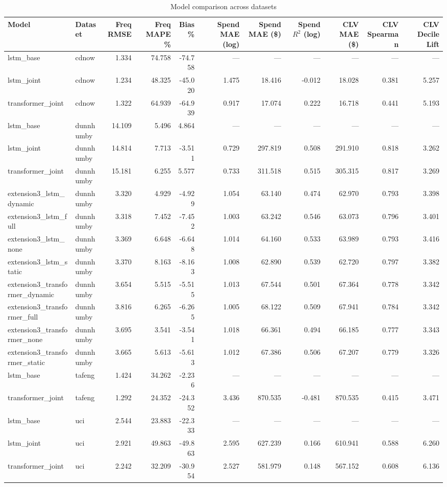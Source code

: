\begin{table}
\caption{Model comparison across datasets}
\label{tab:model_comparison}
\begin{tabular}{llrrrrrrrrr}
\toprule
Model & Dataset & Freq RMSE & Freq MAPE \% & Bias \% & Spend MAE (log) & Spend MAE (\$) & Spend $R^2$ (log) & CLV MAE (\$) & CLV Spearman & CLV Decile Lift \\
\midrule
lstm_base & cdnow & 1.334 & 74.758 & -74.758 & — & — & — & — & — & — \\
lstm_joint & cdnow & 1.234 & 48.325 & -45.020 & 1.475 & 18.416 & -0.012 & 18.028 & 0.381 & 5.257 \\
transformer_joint & cdnow & 1.322 & 64.939 & -64.939 & 0.917 & 17.074 & 0.222 & 16.718 & 0.441 & 5.193 \\
lstm_base & dunnhumby & 14.109 & 5.496 & 4.864 & — & — & — & — & — & — \\
lstm_joint & dunnhumby & 14.814 & 7.713 & -3.511 & 0.729 & 297.819 & 0.508 & 291.910 & 0.818 & 3.262 \\
transformer_joint & dunnhumby & 15.181 & 6.255 & 5.577 & 0.733 & 311.518 & 0.515 & 305.315 & 0.817 & 3.269 \\
extension3_lstm_dynamic & dunnhumby & 3.320 & 4.929 & -4.929 & 1.054 & 63.140 & 0.474 & 62.970 & 0.793 & 3.398 \\
extension3_lstm_full & dunnhumby & 3.318 & 7.452 & -7.452 & 1.003 & 63.242 & 0.546 & 63.073 & 0.796 & 3.401 \\
extension3_lstm_none & dunnhumby & 3.369 & 6.648 & -6.648 & 1.014 & 64.160 & 0.533 & 63.989 & 0.793 & 3.416 \\
extension3_lstm_static & dunnhumby & 3.370 & 8.163 & -8.163 & 1.008 & 62.890 & 0.539 & 62.720 & 0.797 & 3.382 \\
extension3_transformer_dynamic & dunnhumby & 3.654 & 5.515 & -5.515 & 1.013 & 67.544 & 0.501 & 67.364 & 0.778 & 3.342 \\
extension3_transformer_full & dunnhumby & 3.816 & 6.265 & -6.265 & 1.005 & 68.122 & 0.509 & 67.941 & 0.784 & 3.342 \\
extension3_transformer_none & dunnhumby & 3.695 & 3.541 & -3.541 & 1.018 & 66.361 & 0.494 & 66.185 & 0.777 & 3.343 \\
extension3_transformer_static & dunnhumby & 3.665 & 5.613 & -5.613 & 1.012 & 67.386 & 0.506 & 67.207 & 0.779 & 3.326 \\
lstm_base & tafeng & 1.424 & 34.262 & -2.236 & — & — & — & — & — & — \\
transformer_joint & tafeng & 1.292 & 24.352 & -24.352 & 3.436 & 870.535 & -0.481 & 870.535 & 0.415 & 3.471 \\
lstm_base & uci & 2.544 & 23.883 & -22.333 & — & — & — & — & — & — \\
lstm_joint & uci & 2.921 & 49.863 & -49.863 & 2.595 & 627.239 & 0.166 & 610.941 & 0.588 & 6.260 \\
transformer_joint & uci & 2.242 & 32.209 & -30.954 & 2.527 & 581.979 & 0.148 & 567.152 & 0.608 & 6.136 \\
\bottomrule
\end{tabular}
\end{table}
